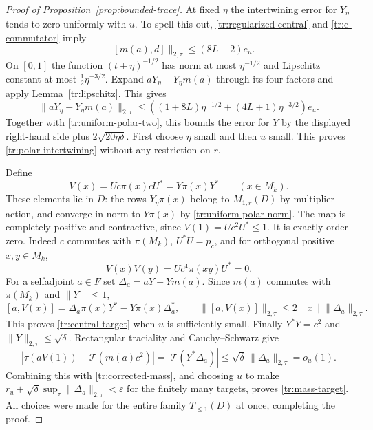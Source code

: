 \begin{proof}[Proof of Proposition~\ref{prop:bounded-trace}]
At fixed $\eta$ the intertwining error for $Y_\eta$ tends to zero
uniformly with $u$.  To spell this out, \eqref{tr:regularized-central}
and \eqref{tr:c-commutator} imply
\[
 \|[m(a),d]\|_{2,\tau}\leq(8L+2)e_u.
\]
On $[0,1]$ the function $(t+\eta)^{-1/2}$ has norm at most
$\eta^{-1/2}$ and Lipschitz constant at most
$\tfrac12\eta^{-3/2}$.  Expand $aY_\eta-Y_\eta m(a)$ through its four
factors and apply Lemma~\ref{tr:lipschitz}.  This gives
\[
 \|aY_\eta-Y_\eta m(a)\|_{2,\tau}
 \leq\left((1+8L)\eta^{-1/2}
                    +(4L+1)\eta^{-3/2}\right)e_u.
\]
Together with \eqref{tr:uniform-polar-two}, this bounds the error for
$Y$ by the displayed right-hand side plus $2\sqrt{20\eta\delta}$.
First choose $\eta$ small and then $u$ small.  This proves
\eqref{tr:polar-intertwining} without any restriction on $r$.

Define
\[
 V(x)=Uc\pi(x)cU^*=Y\pi(x)Y^*\qquad(x\in M_k).
\]
These elements lie in $D$: the rows $Y_\eta\pi(x)$ belong to
$M_{1,r}(D)$ by multiplier action, and converge in norm to
$Y\pi(x)$ by \eqref{tr:uniform-polar-norm}.
The map is completely positive and contractive, since
$V(1)=Uc^2U^*\leq1$.  It is exactly order zero.  Indeed $c$ commutes
with $\pi(M_k)$, $U^*U=p_c$, and for orthogonal positive $x,y\in M_k$,
\[
 V(x)V(y)=Uc^4\pi(xy)U^*=0.
\]
For a selfadjoint $a\in F$ set $\Delta_a=aY-Ym(a)$.  Since $m(a)$
commutes with $\pi(M_k)$ and $\|Y\|\leq1$,
\[
 [a,V(x)]=\Delta_a\pi(x)Y^*-Y\pi(x)\Delta_a^*,\qquad
 \|[a,V(x)]\|_{2,\tau}\leq2\|x\|\|\Delta_a\|_{2,\tau}.
\]
This proves \eqref{tr:central-target} when $u$ is sufficiently small.
Finally $Y^*Y=c^2$ and $\|Y\|_{2,\tau}\leq\sqrt\delta$.  Rectangular
traciality and Cauchy--Schwarz give
\[
 \left|\tau(aV(1))-\mathcal T(m(a)c^2)\right|
 =\left|\mathcal T(Y^*\Delta_a)\right|
 \leq\sqrt\delta\,\|\Delta_a\|_{2,\tau}=o_u(1).
\]
Combining this with \eqref{tr:corrected-mass}, and choosing $u$ to make
$r_u+\sqrt\delta\sup_\tau\|\Delta_a\|_{2,\tau}<\varepsilon$ for the
finitely many targets, proves \eqref{tr:mass-target}.  All choices were
made for the entire family $T_{\leq1}(D)$ at once, completing the proof.
\end{proof}
